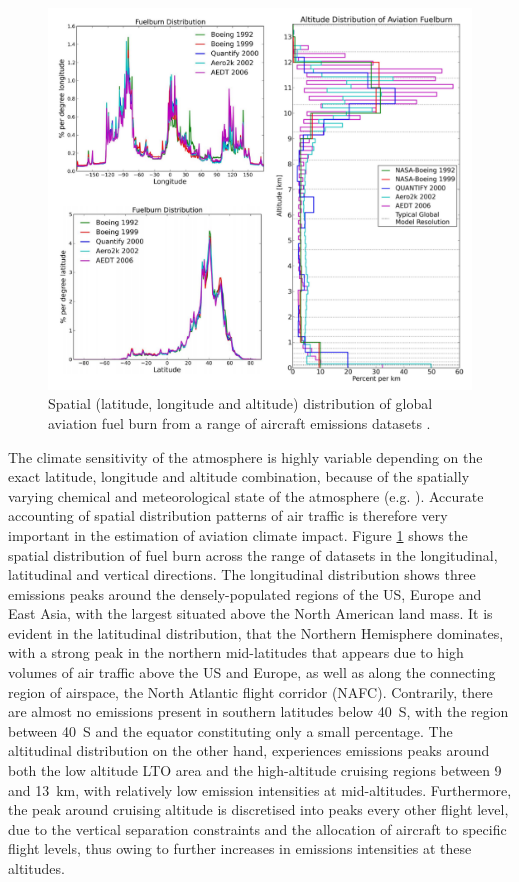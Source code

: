 \begin{figure}[H]
  \centering
  \includegraphics[width=0.8\linewidth]{FB_dist_spatial.pdf}
  \caption{Spatial (latitude, longitude and altitude) distribution of global aviation fuel burn from a range of aircraft emissions datasets \cite{Olsen2013}.}
  \label{FB_dist_spatial}
\end{figure}

The climate sensitivity of the atmosphere is highly variable depending on the exact latitude, longitude and altitude combination, because of the spatially varying chemical and meteorological state of the atmosphere (e.g. \cite{Houghton2001, Inness2013, Emmons2000}). Accurate accounting of spatial distribution patterns of air traffic is therefore very important in the estimation of aviation climate impact. Figure \ref{FB_dist_spatial} shows the spatial distribution of fuel burn across the range of datasets in the longitudinal, latitudinal and vertical directions. The longitudinal distribution shows three emissions peaks around the densely-populated regions of the US, Europe and East Asia, with the largest situated above the North American land mass. It is evident in the latitudinal distribution, that the Northern Hemisphere dominates, with a strong peak in the northern mid-latitudes that appears due to high volumes of air traffic above the US and Europe, as well as along the connecting region of airspace, the North Atlantic flight corridor (NAFC). Contrarily, there are almost no emissions present in southern latitudes below 40\textdegree~S, with the region between 40\textdegree~S and the equator constituting only a small percentage. The altitudinal distribution on the other hand, experiences emissions peaks around both the low altitude LTO area and the high-altitude cruising regions between 9 and 13~km, with relatively low emission intensities at mid-altitudes. Furthermore, the peak around cruising altitude is discretised into peaks every other flight level, due to the vertical separation constraints and the allocation of aircraft to specific flight levels, thus owing to further increases in emissions intensities at these altitudes.

